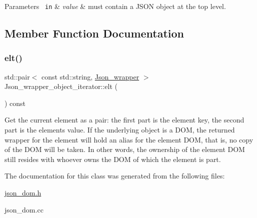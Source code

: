 \begin{DoxyParams}[1]{Parameters}
\mbox{\texttt{ in}}  & {\em value} & must contain a J\+S\+ON object at the top level. \\
\hline
\end{DoxyParams}


\subsection{Member Function Documentation}
\mbox{\label{classJson__wrapper__object__iterator_a9e797ed531962494b1d317221e524d1d}} 
\subsubsection{\texorpdfstring{elt()}{elt()}}
{\footnotesize\ttfamily std\+::pair$<$ const std\+::string, \mbox{\hyperlink{classJson__wrapper}{Json\+\_\+wrapper}} $>$ Json\+\_\+wrapper\+\_\+object\+\_\+iterator\+::elt (\begin{DoxyParamCaption}{ }\end{DoxyParamCaption}) const}

Get the current element as a pair\+: the first part is the element key, the second part is the element\textquotesingle{}s value. If the underlying object is a D\+OM, the returned wrapper for the element will hold an alias for the element D\+OM, that is, no copy of the D\+OM will be taken. In other words, the ownership of the element D\+OM still resides with whoever owns the D\+OM of which the element is part. 

The documentation for this class was generated from the following files\+:\begin{DoxyCompactItemize}
\item 
\mbox{\hyperlink{json__dom_8h}{json\+\_\+dom.\+h}}\item 
json\+\_\+dom.\+cc\end{DoxyCompactItemize}
